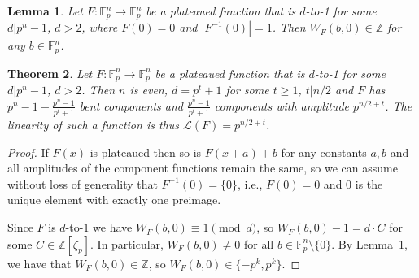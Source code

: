\documentclass[11pt]{article}
\newcommand{\Z}{\mathbb Z}
\newcommand{\F}{\mathbb F}
\theoremstyle{plain}
\newtheorem{theorem}{Theorem}[section]
\newtheorem{lemma}[theorem]{Lemma}
\theoremstyle{definition}
\numberwithin{theorem}{section}
\numberwithin{equation}{section}
\numberwithin{table}{section}
\numberwithin{figure}{section}
\begin{document}
{\begin{lemma} \label{lem:podd}
    Let $F \colon \F_p^n \rightarrow \F_p^n$ be a plateaued function that is $d$-to-1 for some $d|p^n-1$, $d>2$, where $F(0)=0$ and $|F^{-1}(0)|=1$. Then $W_F(b,0) \in \Z$ for any $b \in \F_p^n$.
\end{lemma}

\begin{theorem} \label{thm:platdto1}
    Let $F \colon \F_p^n \rightarrow \F_p^n$ be a plateaued function that is $d$-to-1 for some $d|p^n-1$, $d>2$. Then $n$ is even, $d=p^t+1$ for some $t \geq 1$, $t|n/2$ and $F$ has $p^n-1-\frac{p^n-1}{p^t+1}$ bent components and $\frac{p^n-1}{p^t+1}$ components with amplitude $p^{n/2+t}$. The linearity of such a function is thus $\mathcal{L}(F)=p^{n/2+t}$.
\end{theorem}
\begin{proof}
    If $F(x)$ is plateaued then so is $F(x+a)+b$ for any constants $a,b$ and all amplitudes of the component functions remain the same, so we can assume without loss of generality that $F^{-1}(0)=\{0\}$, i.e., $F(0)=0$ and $0$ is the unique element with exactly one preimage.

    Since $F$ is $d$-to-$1$ we have $W_F(b,0) \equiv 1 \pmod{d}$, so $W_F(b,0)-1=d\cdot C$ for some $C \in \Z[\zeta_p]$. In particular, $W_F(b,0) \neq 0$ for all $b \in \F_p^n \setminus \{0\}$. By Lemma~\ref{lem:podd}, we have that $W_F(b,0) \in \Z$, so $W_F(b,0) \in \{-p^{k},p^k\}$.
    

\end{proof}}
\end{document}
